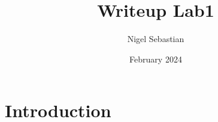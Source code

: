 \documentclass{article}
\title{Writeup Lab1}
\author{Nigel Sebastian}
\date{February 2024}
\begin{document}
\maketitle

\section{Introduction}
\end{document}
